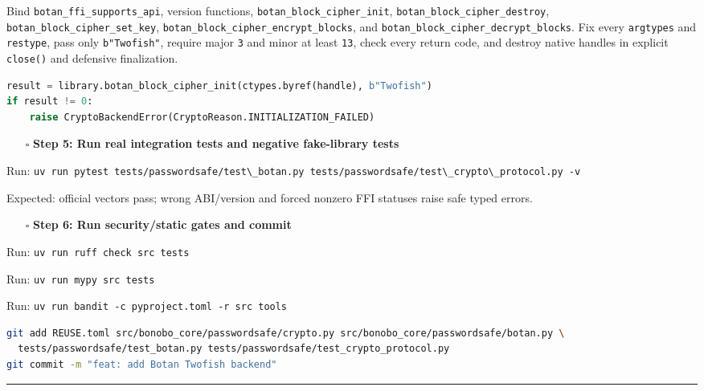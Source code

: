\documentclass[
  letterpaper,
]{article}
\newcommand{\passthrough}[1]{#1}
\providecommand{\tightlist}{%
  \setlength{\itemsep}{0pt}\setlength{\parskip}{0pt}}
\begin{document}
Bind \nolinkurl{botan_ffi_supports_api}, version functions, \nolinkurl{botan_block_cipher_init},
\nolinkurl{botan_block_cipher_destroy}, \nolinkurl{botan_block_cipher_set_key},
\nolinkurl{botan_block_cipher_encrypt_blocks}, and \nolinkurl{botan_block_cipher_decrypt_blocks}. Fix every
\passthrough{\lstinline!argtypes!} and \passthrough{\lstinline!restype!}, pass only \nolinkurl{b"Twofish"}, require
major \passthrough{\lstinline!3!} and minor at least \passthrough{\lstinline!13!}, check every return code, and destroy
native handles in explicit \passthrough{\lstinline!close()!} and defensive finalization.

\begin{lstlisting}[language=Python]
result = library.botan_block_cipher_init(ctypes.byref(handle), b"Twofish")
if result != 0:
    raise CryptoBackendError(CryptoReason.INITIALIZATION_FAILED)
\end{lstlisting}

\begin{itemize}
\tightlist
\item[$\square$]
  \textbf{Step 5: Run real integration tests and negative fake-library tests}
\end{itemize}

Run:
\passthrough{\lstinline!uv run pytest tests/passwordsafe/test\_botan.py tests/passwordsafe/test\_crypto\_protocol.py -v!}

Expected: official vectors pass; wrong ABI/version and forced nonzero FFI statuses raise safe typed errors.

\begin{itemize}
\tightlist
\item[$\square$]
  \textbf{Step 6: Run security/static gates and commit}
\end{itemize}

Run: \passthrough{\lstinline!uv run ruff check src tests!}

Run: \passthrough{\lstinline!uv run mypy src tests!}

Run: \passthrough{\lstinline!uv run bandit -c pyproject.toml -r src tools!}

\begin{lstlisting}[language=bash]
git add REUSE.toml src/bonobo_core/passwordsafe/crypto.py src/bonobo_core/passwordsafe/botan.py \
  tests/passwordsafe/test_botan.py tests/passwordsafe/test_crypto_protocol.py
git commit -m "feat: add Botan Twofish backend"
\end{lstlisting}

\begin{center}\rule{0.5\linewidth}{0.5pt}\end{center}
\end{document}
